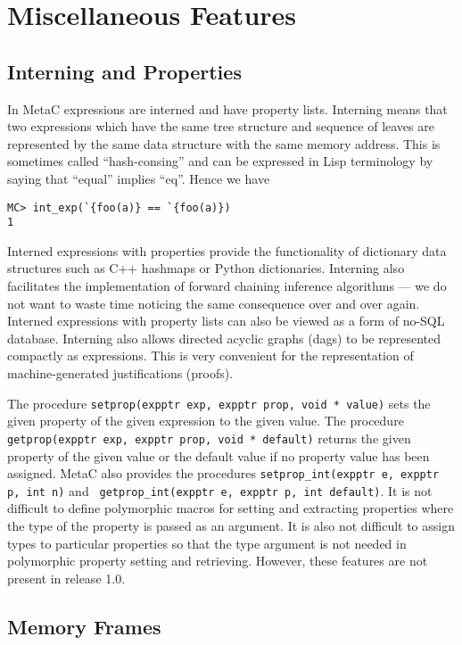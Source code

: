 \documentclass{article}
\begin{document}
\section{Miscellaneous Features}

\subsection{Interning and Properties}

In MetaC expressions are interned and have property lists.
Interning means that two expressions which have the same tree structure and sequence of leaves are represented by the same data structure with the same memory address.
This is sometimes called ``hash-consing'' and can be expressed in Lisp terminology by saying that ``equal'' implies ``eq''.
Hence we have
\begin{verbatim}
MC> int_exp(`{foo(a)} == `{foo(a)})
1
\end{verbatim}
Interned expressions with properties provide the functionality of dictionary data structures such as C++ hashmaps or Python dictionaries.
Interning also facilitates the implementation of forward chaining inference algorithms --- we do not want to waste time noticing the same
consequence over and over again.  Interned expressions with property lists can also be viewed as a form of no-SQL database.
Interning also allows directed acyclic graphs (dags) to be represented compactly as expressions.  This is very convenient
for the representation of machine-generated justifications (proofs).

The procedure {\tt setprop(expptr exp, expptr prop, void * value)}
sets the given property of the given expression to the given value.
The procedure {\tt getprop(expptr exp, expptr prop, void * default)}
returns the given property of the given value or the default value if
no property value has been assigned.  MetaC also provides the
procedures {\tt setprop\_int(expptr e, expptr p, int n)} and {\tt
  getprop\_int(expptr e, expptr p, int default)}.  It is not difficult
to define polymorphic macros for setting and extracting properties
where the type of the property is passed as an argument.  It is also
not difficult to assign types to particular properties so that the
type argument is not needed in polymorphic property setting and
retrieving.  However, these features are not present in release 1.0.

\subsection{Memory Frames}
\label{sec:memory}
\end{document}
